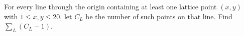 For every line through the origin containing at least one lattice point $(x,y)$ with $1\le x,y\le20$, let $C_L$ be the number of such points on that line. Find $\sum_L(C_L-1)$.
